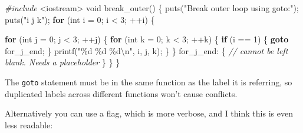 \documentclass[
]{book}
\newenvironment{Shaded}{\begin{snugshade}}{\end{snugshade}}
\newcommand{\CommentTok}[1]{\textcolor[rgb]{0.56,0.35,0.01}{\textit{#1}}}
\newcommand{\ControlFlowTok}[1]{\textcolor[rgb]{0.13,0.29,0.53}{\textbf{#1}}}
\newcommand{\DataTypeTok}[1]{\textcolor[rgb]{0.13,0.29,0.53}{#1}}
\newcommand{\DecValTok}[1]{\textcolor[rgb]{0.00,0.00,0.81}{#1}}
\newcommand{\ImportTok}[1]{#1}
\newcommand{\NormalTok}[1]{#1}
\newcommand{\PreprocessorTok}[1]{\textcolor[rgb]{0.56,0.35,0.01}{\textit{#1}}}
\newcommand{\SpecialCharTok}[1]{\textcolor[rgb]{0.00,0.00,0.00}{#1}}
\newcommand{\StringTok}[1]{\textcolor[rgb]{0.31,0.60,0.02}{#1}}
\begin{document}
\begin{Shaded}
\begin{Highlighting}[]
\PreprocessorTok{\#include }\ImportTok{\textless{}iostream\textgreater{}}
\DataTypeTok{void}\NormalTok{ break\_outer()}
\NormalTok{\{}
\NormalTok{    puts(}\StringTok{"Break outer loop using goto:"}\NormalTok{);}
\NormalTok{    puts(}\StringTok{"i j k"}\NormalTok{);}
    \ControlFlowTok{for}\NormalTok{ (}\DataTypeTok{int}\NormalTok{ i = }\DecValTok{0}\NormalTok{; i \textless{} }\DecValTok{3}\NormalTok{; ++i)}
\NormalTok{    \{}

        \ControlFlowTok{for}\NormalTok{ (}\DataTypeTok{int}\NormalTok{ j = }\DecValTok{0}\NormalTok{; j \textless{} }\DecValTok{3}\NormalTok{; ++j)}
\NormalTok{        \{}
            \ControlFlowTok{for}\NormalTok{ (}\DataTypeTok{int}\NormalTok{ k = }\DecValTok{0}\NormalTok{; k \textless{} }\DecValTok{3}\NormalTok{; ++k)}
\NormalTok{            \{}
                \ControlFlowTok{if}\NormalTok{ (i == }\DecValTok{1}\NormalTok{)}
\NormalTok{                \{}
                    \ControlFlowTok{goto}\NormalTok{ for\_j\_end;}
\NormalTok{                \}}
\NormalTok{                printf(}\StringTok{"}\SpecialCharTok{\%d}\StringTok{ }\SpecialCharTok{\%d}\StringTok{ }\SpecialCharTok{\%d\textbackslash{}n}\StringTok{"}\NormalTok{, i, j, k);}
\NormalTok{            \}}
\NormalTok{        \}}
\NormalTok{    for\_j\_end:}
\NormalTok{    \{}
        \CommentTok{// cannot be left blank. Needs a placeholder}
\NormalTok{    \}}
\NormalTok{    \}}
\NormalTok{\}}
\end{Highlighting}
\end{Shaded}

The \texttt{goto} statement must be in the same function as the label it is referring,
so duplicated labels across different functions won't cause conflicts.

Alternatively you can use a flag, which is more verbose, and I think this is even less readable:
\end{document}
